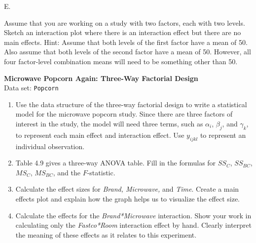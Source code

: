 \documentclass[
]{report}
\newcounter{excount}
\renewcommand{\theexcount}{E\arabic{excount}}
\begin{document}
\begin{list}{\theexcount.}{ \setlength{\itemsep}{1.2em}}
  \item Assume that you are working on a study with two factors, each with two levels. Sketch an interaction plot where there is an interaction effect but there are no main effects. Hint: Assume that both levels of the first factor have a mean of 50. Also assume that both levels of the second factor have a mean of 50. However, all four factor-level combination means will need to be something other than 50.

  \item \textbf{Microwave Popcorn Again: Three-Way Factorial Design}\\
  Data set: \texttt{Popcorn}
  \begin{enumerate}
    \item Use the data structure of the three-way factorial design to write a statistical model for the microwave popcorn study. Since there are three factors of interest in the study, the model will need three terms, such as $\alpha_i$, $\beta_j$, and $\gamma_k$, to represent each main effect and interaction effect. Use $y_{ijkl}$ to represent an individual observation.
    \item Table 4.9 gives a three-way ANOVA table. Fill in the formulas for $SS_C$, $SS_{BC}$, $MS_C$, $MS_{BC}$, and the $F$-statistic.
    \item Calculate the effect sizes for \textit{Brand, Microwave,} and \textit{Time}. Create a main effects plot and explain how the graph helps us to visualize the effect size.
    \item Calculate the effects for the \textit{Brand*Microwave} interaction. Show your work in calculating only the \textit{Fastco*Room} interaction effect by hand. Clearly interpret the meaning of these effects as it relates to this experiment.
  \end{enumerate}


\end{list}
\end{document}
